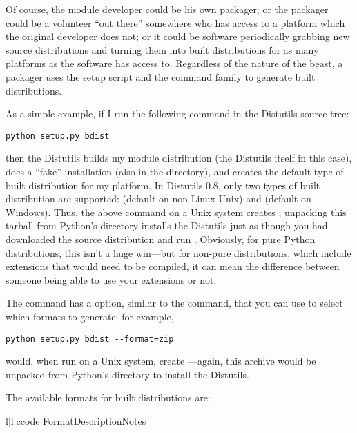 \documentclass{howto}
\begin{document}
Of course, the module developer could be his own packager; or the
packager could be a volunteer ``out there'' somewhere who has access to
a platform which the original developer does not; or it could be
software periodically grabbing new source distributions and turning them
into built distributions for as many platforms as the software has
access to.  Regardless of the nature of the beast, a packager uses the
setup script and the  command family to generate built
distributions.

As a simple example, if I run the following command in the Distutils
source tree:
\begin{verbatim}
python setup.py bdist
\end{verbatim}
then the Distutils builds my module distribution (the Distutils itself
in this case), does a ``fake'' installation (also in the 
directory), and creates the default type of built distribution for my
platform.  In Distutils 0.8, only two types of built distribution are
supported:  (default on non-Linux Unix) and 
(default on Windows).  Thus, the above command on a Unix system creates
; unpacking this tarball from
Python's  directory installs the Distutils just as
though you had downloaded the source distribution and run .  Obviously, for pure Python distributions, this
isn't a huge win---but for non-pure distributions, which include
extensions that would need to be compiled, it can mean the difference
between someone being able to use your extensions or not.


The  command has a  option, similar to
the  command, that you can use to select which formats to
generate: for example,
\begin{verbatim}
python setup.py bdist --format=zip
\end{verbatim}
would, when run on a Unix system, create
---again, this archive would be
unpacked from Python's  directory to install the
Distutils.

The available formats for built distributions are:
\begin{tableiii}{l|l|c}{code}%
  {Format}{Description}{Notes}
\end{tableiii}
\end{document}
